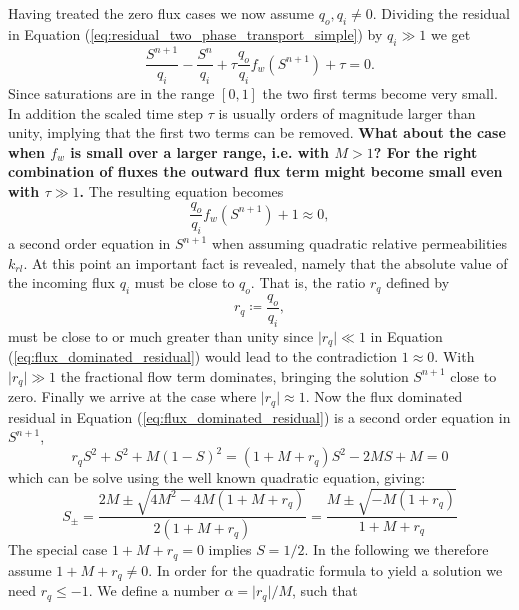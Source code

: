 Having treated the zero flux cases we now assume $q_o,q_i \neq 0$. Dividing the residual in Equation (\ref{eq:residual_two_phase_transport_simple}) by $q_i \gg 1$ we get
\begin{equation*}
\frac{S^{n+1}}{q_i} - \frac{S^n}{q_i} + \tau \frac{q_o}{q_i} f_w(S^{n+1}) + \tau = 0.
\end{equation*}
Since saturations are in the range $[0,1]$ the two first terms become very small. In addition the scaled time step $\tau$ is usually orders of magnitude larger than unity, implying that the first two terms can be removed. \textbf{What about the case when $f_w$ is small over a larger range, i.e. with $M > 1$? For the right combination of fluxes the outward flux term might become small even with $\tau \gg 1$.}  The resulting equation becomes
\begin{equation} \label{eq:flux_dominated_residual}
\frac{q_o}{q_i} f_w(S^{n+1}) + 1 \approx 0,
\end{equation}
a second order equation in $S^{n+1}$ when assuming quadratic relative permeabilities $k_{rl}$. At this point an important fact is revealed, namely that the absolute value of the incoming flux $q_i$ must be close to $q_o$. That is, the ratio $r_q$ defined by
\begin{equation*}
r_q \coloneqq \frac{q_o}{q_i},
\end{equation*}
must be close to or much greater than unity since $\lvert r_q \rvert \ll 1$ in Equation (\ref{eq:flux_dominated_residual}) would lead to the contradiction $1 \approx 0$. With $\lvert r_q \rvert \gg 1$ the fractional flow term dominates, bringing the solution $S^{n+1}$ close to zero. Finally we arrive at the case where $\lvert r_q \rvert \approx 1$. Now the flux dominated residual in Equation (\ref{eq:flux_dominated_residual}) is a second order equation in $S^{n+1}$,
\begin{equation*}
r_q S^2 +  S^2 + M(1-S)^2 = (1+M+r_q)S^2 - 2MS + M = 0
\end{equation*}
which can be solve using the well known quadratic equation, giving:
\begin{equation*}
S_{\pm} = \frac{2M \pm \sqrt{4M^2 - 4 M (1+M+r_q)}}{2(1+M+r_q)} = \frac{M \pm \sqrt{ - M (1+r_q)}}{1+M+r_q}
\end{equation*}
The special case $1+M+r_q = 0$ implies $S = 1/2$. In the following we therefore assume $1+M+r_q \neq 0$. In order for the quadratic formula to yield a solution we need $r_q \leq -1$. We define a number $\alpha = \lvert r_q \rvert / M$, such that
